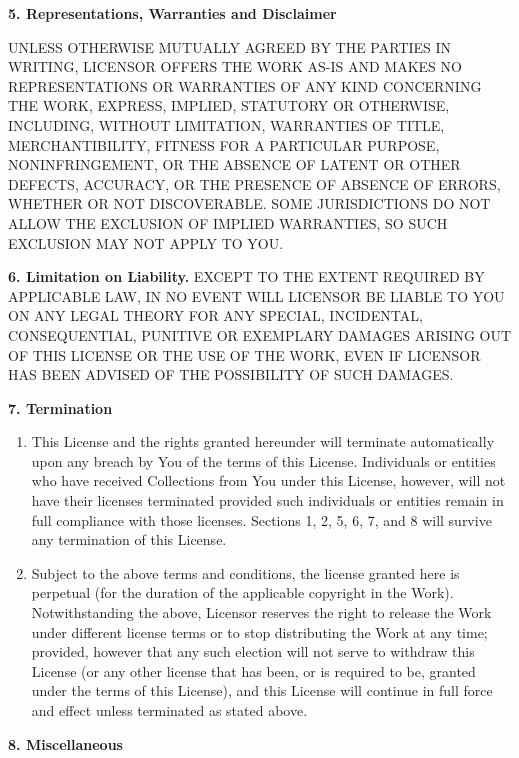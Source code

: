 \par \textbf{5. Representations, Warranties and
Disclaimer}
\par UNLESS OTHERWISE MUTUALLY AGREED BY THE PARTIES IN
WRITING, LICENSOR OFFERS THE WORK AS-IS AND MAKES NO
REPRESENTATIONS OR WARRANTIES OF ANY KIND CONCERNING THE
WORK, EXPRESS, IMPLIED, STATUTORY OR OTHERWISE, INCLUDING,
WITHOUT LIMITATION, WARRANTIES OF TITLE, MERCHANTIBILITY,
FITNESS FOR A PARTICULAR PURPOSE, NONINFRINGEMENT, OR THE
ABSENCE OF LATENT OR OTHER DEFECTS, ACCURACY, OR THE
PRESENCE OF ABSENCE OF ERRORS, WHETHER OR NOT DISCOVERABLE.
SOME JURISDICTIONS DO NOT ALLOW THE EXCLUSION OF IMPLIED
WARRANTIES, SO SUCH EXCLUSION MAY NOT APPLY TO YOU.
\par \textbf{6. Limitation on Liability.} EXCEPT TO
THE EXTENT REQUIRED BY APPLICABLE LAW, IN NO EVENT WILL
LICENSOR BE LIABLE TO YOU ON ANY LEGAL THEORY FOR ANY
SPECIAL, INCIDENTAL, CONSEQUENTIAL, PUNITIVE OR EXEMPLARY
DAMAGES ARISING OUT OF THIS LICENSE OR THE USE OF THE WORK,
EVEN IF LICENSOR HAS BEEN ADVISED OF THE POSSIBILITY OF
SUCH DAMAGES.
\par \textbf{7. Termination}
\begin{enumerate}
\item This License and the rights granted hereunder will
terminate automatically upon any breach by You of the
terms of this License. Individuals or entities who have
received Collections from You under this License,
however, will not have their licenses terminated provided
such individuals or entities remain in full compliance
with those licenses. Sections 1, 2, 5, 6, 7, and 8 will
survive any termination of this License.
\item Subject to the above terms and conditions, the
license granted here is perpetual (for the duration of
the applicable copyright in the Work). Notwithstanding
the above, Licensor reserves the right to release the
Work under different license terms or to stop
distributing the Work at any time; provided, however that
any such election will not serve to withdraw this License
(or any other license that has been, or is required to
be, granted under the terms of this License), and this
License will continue in full force and effect unless
terminated as stated above.
\end{enumerate}
\par \textbf{8. Miscellaneous}
